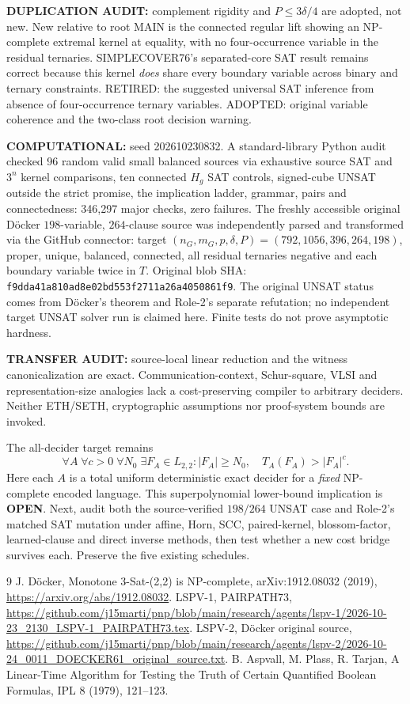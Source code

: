 \documentclass[11pt]{article}
\begin{document}
\textbf{DUPLICATION AUDIT:} complement rigidity and $P\le3\delta/4$ are adopted, not new. New relative to root MAIN is the connected regular lift showing an NP-complete extremal kernel at equality, with no four-occurrence variable in the residual ternaries. SIMPLECOVER76's separated-core SAT result remains correct because this kernel \emph{does} share every boundary variable across binary and ternary constraints. RETIRED: the suggested universal SAT inference from absence of four-occurrence ternary variables. ADOPTED: original variable coherence and the two-class root decision warning.

\textbf{COMPUTATIONAL:} seed 202610230832. A standard-library Python audit checked 96 random valid small balanced sources via exhaustive source SAT and $3^n$ kernel comparisons, ten connected $H_g$ SAT controls, signed-cube UNSAT outside the strict promise, the implication ladder, grammar, pairs and connectedness: 346,297 major checks, zero failures. The freshly accessible original D\"ocker $198$-variable, $264$-clause source was independently parsed and transformed via the GitHub connector: target $(n_G,m_G,p,\delta,P)=(792,1056,396,264,198)$, proper, unique, balanced, connected, all residual ternaries negative and each boundary variable twice in $T$. Original blob SHA: \texttt{f9dda41a810ad8e02bd553f2711a26a4050861f9}. The original UNSAT status comes from D\"ocker's theorem and Role-2's separate refutation; no independent target UNSAT solver run is claimed here. Finite tests do not prove asymptotic hardness.

\textbf{TRANSFER AUDIT:} source-local linear reduction and the witness canonicalization are exact. Communication-context, Schur-square, VLSI and representation-size analogies lack a cost-preserving compiler to arbitrary deciders. Neither ETH/SETH, cryptographic assumptions nor proof-system bounds are invoked.

The all-decider target remains
\[
\forall A\;\forall c>0\;\forall N_0\;\exists F_A\in L_{2,2}:
|F_A|\ge N_0,\quad T_A(F_A)>|F_A|^c.
\]
Here each $A$ is a total uniform deterministic exact decider for a \emph{fixed} NP-complete encoded language. This superpolynomial lower-bound implication is \textbf{OPEN}. Next, audit both the source-verified $198/264$ UNSAT case and Role-2's matched SAT mutation under affine, Horn, SCC, paired-kernel, blossom-factor, learned-clause and direct inverse methods, then test whether a new cost bridge survives each. Preserve the five existing schedules.

\begin{thebibliography}{9}
 J. D\"ocker, Monotone 3-Sat-(2,2) is NP-complete, arXiv:1912.08032 (2019), \url{https://arxiv.org/abs/1912.08032}.
 LSPV-1, PAIRPATH73, \url{https://github.com/j15marti/pnp/blob/main/research/agents/lspv-1/2026-10-23_2130_LSPV-1_PAIRPATH73.tex}.
 LSPV-2, D\"ocker original source, \url{https://github.com/j15marti/pnp/blob/main/research/agents/lspv-2/2026-10-24_0011_DOECKER61_original_source.txt}.
 B. Aspvall, M. Plass, R. Tarjan, A Linear-Time Algorithm for Testing the Truth of Certain Quantified Boolean Formulas, IPL 8 (1979), 121--123.
\end{thebibliography}
\end{document}
